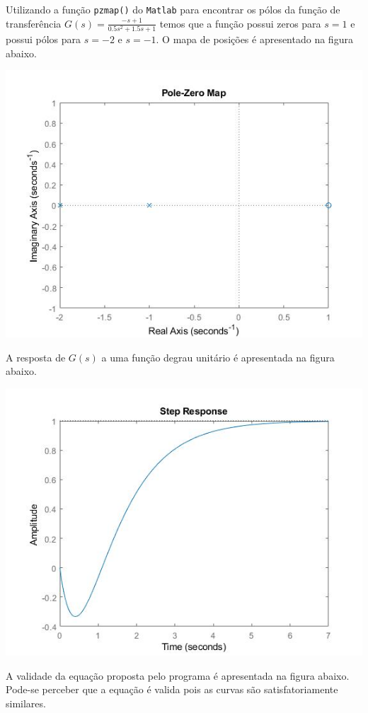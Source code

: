 \documentclass[
]{book}
\begin{document}
Utilizando a função \texttt{pzmap()} do \texttt{Matlab} para encontrar os pólos da função de transferência \(G(s) = \frac {-s +1}{0.5s^2+1.5s+1}\) temos que a função possui zeros para \(s=1\) e possui pólos para \(s = -2\) e \(s = -1\). O mapa de posições é apresentado na figura abaixo.

\includegraphics{Imagens/Lab2/prob6A.jpg}

A resposta de \(G(s)\) a uma função degrau unitário é apresentada na figura abaixo.

\includegraphics{Imagens/Lab2/prob6B.jpg}

A validade da equação proposta pelo programa é apresentada na figura abaixo. Pode-se perceber que a equação é valida pois as curvas são satisfatoriamente similares.
\end{document}
